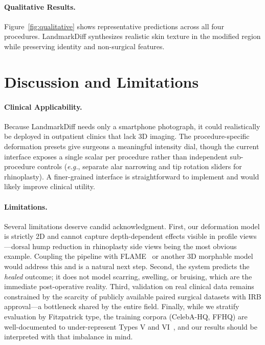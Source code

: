 \documentclass[runningheads]{llncs}
\newcommand{\method}{LandmarkDiff}
\newcommand{\eg}{\textit{e.g.}}
\begin{document}
\paragraph{Qualitative Results.}
Figure~\ref{fig:qualitative} shows representative predictions across
all four procedures.  \method{} synthesizes realistic skin texture in
the modified region while preserving identity and non-surgical features.

\section{Discussion and Limitations}
\label{sec:discussion}

\paragraph{Clinical Applicability.}
Because \method{} needs only a smartphone photograph, it could
realistically be deployed in outpatient clinics that lack 3D imaging.
The procedure-specific deformation presets give surgeons a meaningful
intensity dial, though the current interface exposes a single scalar
per procedure rather than independent sub-procedure controls (\eg,
separate alar narrowing and tip rotation sliders for rhinoplasty).
A finer-grained interface is straightforward to implement and would
likely improve clinical utility.

\paragraph{Limitations.}
Several limitations deserve candid acknowledgment.
First, our deformation model is strictly 2D and cannot capture
depth-dependent effects visible in profile views---dorsal hump reduction
in rhinoplasty side views being the most obvious example.  Coupling the
pipeline with FLAME~\cite{li2017flame} or another 3D morphable model
would address this and is a natural next step.
Second, the system predicts the \emph{healed} outcome; it does not model
scarring, swelling, or bruising, which are the immediate post-operative
reality.
Third, validation on real clinical data remains constrained by the
scarcity of publicly available paired surgical datasets with IRB
approval---a bottleneck shared by the entire field.
Finally, while we stratify evaluation by Fitzpatrick type, the training
corpora (CelebA-HQ, FFHQ) are well-documented to under-represent Types
V and VI~\cite{merler2019diversity}, and our results should be
interpreted with that imbalance in mind.
\end{document}
